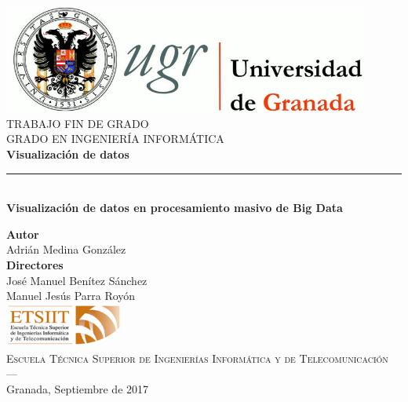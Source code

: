 \begin{titlepage}

	\newlength{\centeroffset}
	\setlength{\centeroffset}{-0.5\oddsidemargin}
	\addtolength{\centeroffset}{0.5\evensidemargin}
	\thispagestyle{empty}
	
	\noindent\hspace*{\centeroffset}\begin{minipage}{\textwidth}
		
		\centering
		\includegraphics[width=0.9\textwidth]{imagenes/logo_ugr.jpg}\\[1.4cm]
		
		\textsc{ \Large TRABAJO FIN DE GRADO\\[0.2cm]}
		\textsc{GRADO EN INGENIERÍA INFORMÁTICA}\\[1cm]
		{\Huge\bfseries Visualización de datos\\
		}
		\noindent\rule[-1ex]{\textwidth}{3pt}\\[3.5ex]
		{\large\bfseries Visualización de datos en procesamiento masivo de Big Data}
	\end{minipage}
	
	\vspace{2.5cm}
	\noindent\hspace*{\centeroffset}\begin{minipage}{\textwidth}
		\centering
		
		\textbf{Autor}\\ {Adrián Medina González}\\[2.5ex]
		\textbf{Directores}\\
		{José Manuel Benítez Sánchez\\
			Manuel Jesús Parra Royón}\\[2cm]
		\includegraphics[width=0.3\textwidth]{imagenes/etsiit_logo.png}\\[0.1cm]
		\textsc{Escuela Técnica Superior de Ingenierías Informática y de Telecomunicación}\\
		\textsc{---}\\
		Granada, Septiembre de 2017
	\end{minipage}
\end{titlepage}
